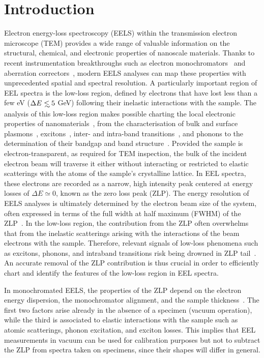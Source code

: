 \section{Introduction}
\label{sec:introduction}

Electron energy-loss spectroscopy (EELS) within the transmission electron microscope (TEM) provides
a wide range of
valuable information on the structural, chemical, and electronic properties of nanoscale materials.
%
Thanks to recent instrumentation breakthroughs
such as electron monochromators~\cite{Terauchi:2005, Freitag:2005} and aberration correctors~\cite{Haider:1998},
modern EELS analyses can map these properties with unprecedented spatial and spectral resolution.
%
A particularly important region of EEL spectra is
the low-loss region, defined by electrons that have lost
less than a few eV ($\Delta E\lsim 5$ GeV) following their inelastic interactions
with the sample.
%
The analysis of this low-loss region makes possible charting the local
electronic properties of nanomaterials~\cite{Geiger:1967}, from the characterisation of
bulk and surface plasmons~\cite{Schaffer:2008}, excitons~\cite{Erni:2005}, 
inter- and intra-band transitions~\cite{Rafferty:1998},
and phonons to the determination of their bandgap and band structure~\cite{Stoger:2008}.
%
Provided the sample is electron-transparent, as required for TEM inspection,
the bulk of the incident electron beam will traverse it
either without interacting or restricted to elastic scatterings with the atoms
of the sample's crystalline lattice.
%
In EEL spectra, these electrons are recorded as a narrow,
high intensity peak centered at energy losses
of $\Delta E\simeq 0$, known as the zero loss peak (ZLP).
%
The energy resolution of EELS analyses is ultimately determined by
the electron beam size of the system, often expressed in terms
of the full width at half maximum (FWHM) of the
ZLP~\cite{Egerton:2009}.
%
In the low-loss region, the contribution from the ZLP
often overwhelms that from the inelastic scatterings arising with
the interactions of the beam electrons
with the sample.
%
Therefore, relevant signals of low-loss phenomena such as excitons,
phonons, and intraband transitions risk being drowned
in ZLP tail~\cite{Abajo:2010}.
%
An accurate removal of the ZLP
contribution is thus crucial in order to efficiently chart and identify the features
of the low-loss region in EEL spectra. 

In monochromated EELS, the properties of the ZLP depend on the electron energy dispersion,
the monochromator alignment, and the sample thickness~\cite{Park:2008, Stoger:2008}.
%
The first two factors arise already in the absence of a specimen (vacuum operation),
while the third is associated
to elastic interactions with the sample such as atomic scatterings,
phonon excitation, and exciton losses.
%
This implies that EEL measurements in vacuum can be used for calibration purposes
but not to subtract the ZLP from spectra taken on specimens, since their shapes will differ
in general.

